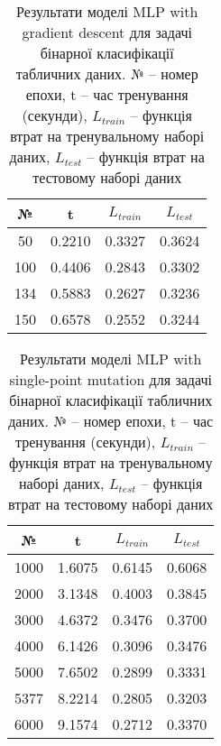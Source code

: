 \begin{table}[ht]
	\centering
	\begin{adjustbox}{max width=\textwidth}
		\begin{tabular}{|c|c|c|c|}
			\hline 
			№ & t & $L_{train}$ & $L_{test}$ \\
			\hline 
			50 & 0.2210 & 0.3327 & 0.3624 \\
			\hline 
			100 & 0.4406 & 0.2843 & 0.3302 \\
			\hline
			134 & 0.5883 & 0.2627 & 0.3236 \\
			\hline
			150 & 0.6578 & 0.2552 & 0.3244 \\
			\hline
		\end{tabular}
	\end{adjustbox}
	\caption{Результати моделі MLP with gradient descent для задачі бінарної класифікації табличних даних. № -- номер епохи, t -- час тренування (секунди), $L_{train}$ -- функція втрат на тренувальному наборі даних, $L_{test}$ -- функція втрат на тестовому наборі даних}
	\label{mlp_gd_bc_td_results}
\end{table}

\begin{table}[ht]
	\centering
	\begin{adjustbox}{max width=\textwidth}
		\begin{tabular}{|c|c|c|c|}
			\hline 
			№ & t & $L_{train}$ & $L_{test}$ \\
			\hline 
			1000 & 1.6075 & 0.6145 & 0.6068 \\
			\hline 
			2000 & 3.1348 & 0.4003 & 0.3845 \\
			\hline
			3000 & 4.6372 & 0.3476 & 0.3700 \\
			\hline
			4000 & 6.1426 & 0.3096 & 0.3476 \\
			\hline
			5000 & 7.6502 & 0.2899 & 0.3331 \\
			\hline
			5377 & 8.2214 & 0.2805 & 0.3203 \\
			\hline
			6000 & 9.1574 & 0.2712 & 0.3370 \\
			\hline
		\end{tabular}
	\end{adjustbox}
	\caption{Результати моделі MLP with single-point mutation для задачі бінарної класифікації табличних даних. № -- номер епохи, t -- час тренування (секунди), $L_{train}$ -- функція втрат на тренувальному наборі даних, $L_{test}$ -- функція втрат на тестовому наборі даних}
	\label{mlp_spm_bc_td_results}
\end{table}

